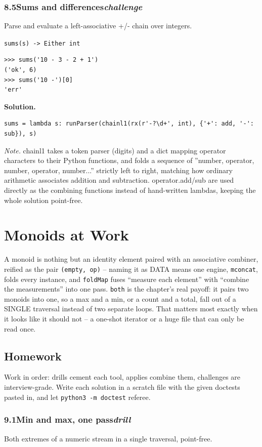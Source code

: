 \documentclass[10pt,letterpaper]{book}
\begin{document}
\subsection*{8.5\quad Sums and differences\hfill\textnormal{\textit{challenge}}}
Parse and evaluate a left-associative +/- chain over integers.

\noindent\texttt{sums(s) -> Either int}
\begin{lstlisting}[style=ex]
>>> sums('10 - 3 - 2 + 1')
('ok', 6)
>>> sums('10 -')[0]
'err'
\end{lstlisting}
\noindent\textbf{Solution.}
\begin{lstlisting}[style=code]
sums = lambda s: runParser(chainl1(rx(r'-?\d+', int), {'+': add, '-': sub}), s)
\end{lstlisting}
\noindent\textit{Note.} chainl1 takes a token parser (digits) and a dict mapping operator characters to their Python functions, and folds a sequence of ''number, operator, number, operator, number...'' strictly left to right, matching how ordinary arithmetic associates addition and subtraction. operator.add/sub are used directly as the combining functions instead of hand-written lambdas, keeping the whole solution point-free.

\clearpage
\chapter{Monoids at Work}

A monoid is nothing but an identity element paired with an associative
combiner, reified as the pair \texttt{(empty, op)} -- naming it as DATA
means one engine, \texttt{mconcat}, folds every instance, and
\texttt{foldMap} fuses ``measure each element'' with ``combine the
measurements'' into one pass. \texttt{both} is the chapter's real payoff:
it pairs two monoids into one, so a max and a min, or a count and a total,
fall out of a SINGLE traversal instead of two separate loops. That matters
most exactly when it looks like it should not -- a one-shot iterator or a
huge file that can only be read once.
\section{Homework}
Work in order: drills cement each tool, applies combine them,
challenges are interview-grade. Write each solution in a scratch file with
the given doctests pasted in, and let \texttt{python3 -m doctest} referee.
\subsection*{9.1\quad Min and max, one pass\hfill\textnormal{\textit{drill}}}
Both extremes of a numeric stream in a single traversal, point-free.
\end{document}
